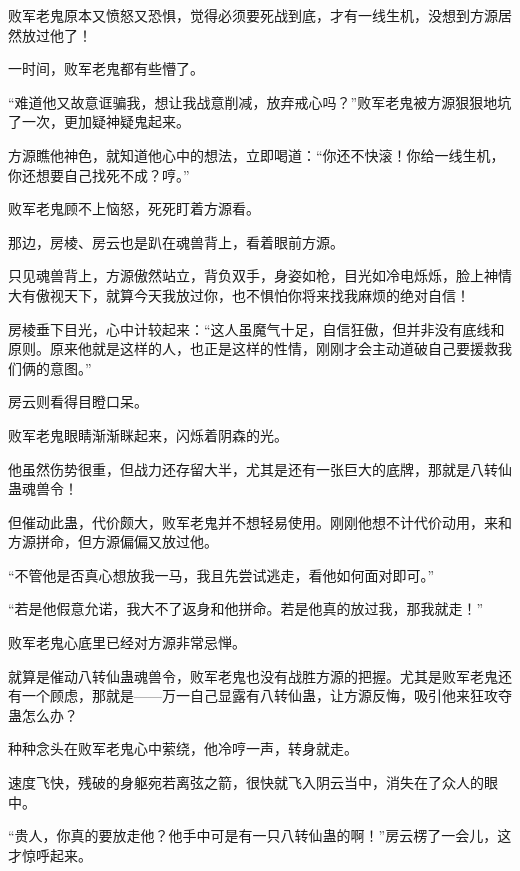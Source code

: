 \begin{this_body}
败军老鬼原本又愤怒又恐惧，觉得必须要死战到底，才有一线生机，没想到方源居然放过他了！

一时间，败军老鬼都有些懵了。

“难道他又故意诓骗我，想让我战意削减，放弃戒心吗？”败军老鬼被方源狠狠地坑了一次，更加疑神疑鬼起来。

方源瞧他神色，就知道他心中的想法，立即喝道：“你还不快滚！你给一线生机，你还想要自己找死不成？哼。”

败军老鬼顾不上恼怒，死死盯着方源看。

那边，房棱、房云也是趴在魂兽背上，看着眼前方源。

只见魂兽背上，方源傲然站立，背负双手，身姿如枪，目光如冷电烁烁，脸上神情大有傲视天下，就算今天我放过你，也不惧怕你将来找我麻烦的绝对自信！

房棱垂下目光，心中计较起来：“这人虽魔气十足，自信狂傲，但并非没有底线和原则。原来他就是这样的人，也正是这样的性情，刚刚才会主动道破自己要援救我们俩的意图。”

房云则看得目瞪口呆。

败军老鬼眼睛渐渐眯起来，闪烁着阴森的光。

他虽然伤势很重，但战力还存留大半，尤其是还有一张巨大的底牌，那就是八转仙蛊魂兽令！

但催动此蛊，代价颇大，败军老鬼并不想轻易使用。刚刚他想不计代价动用，来和方源拼命，但方源偏偏又放过他。

“不管他是否真心想放我一马，我且先尝试逃走，看他如何面对即可。”

“若是他假意允诺，我大不了返身和他拼命。若是他真的放过我，那我就走！”

败军老鬼心底里已经对方源非常忌惮。

就算是催动八转仙蛊魂兽令，败军老鬼也没有战胜方源的把握。尤其是败军老鬼还有一个顾虑，那就是——万一自己显露有八转仙蛊，让方源反悔，吸引他来狂攻夺蛊怎么办？

种种念头在败军老鬼心中萦绕，他冷哼一声，转身就走。

速度飞快，残破的身躯宛若离弦之箭，很快就飞入阴云当中，消失在了众人的眼中。

“贵人，你真的要放走他？他手中可是有一只八转仙蛊的啊！”房云楞了一会儿，这才惊呼起来。

\end{this_body}

